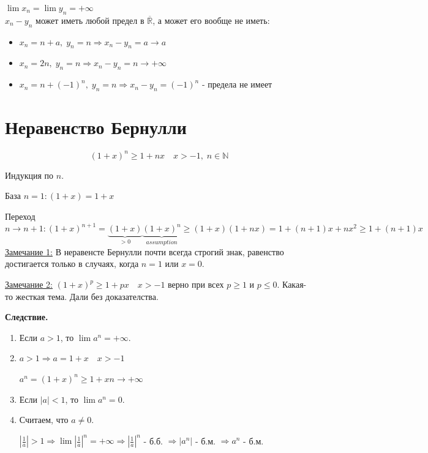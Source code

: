 \documentclass[12pt,letterpaper]{report}
\makeatletter
\theoremstyle{definition}
\renewenvironment{proof}[1][\proofname]{%
   \par\pushQED{\qed}\normalfont%
   \topsep6\p@\@plus6\p@\relax
   \trivlist\item[\hskip\labelsep\bfseries#1\@addpunct{.}]%
   \ignorespaces
}{%
   \popQED\endtrivlist\@endpefalse
}
\makeatother
\begin{document}
    $\lim x_n = \lim y_n = +\infty$ \\
    $x_n - y_n$  может иметь любой предел в $\overline{\mathbb{R}}$, а может его вообще не иметь:
    \begin{itemize}
        \item $x_n = n + a,\; y_n = n \Rightarrow x_n - y_n = a \to a$
        \item $x_n = 2n,\; y_n = n \Rightarrow x_n - y_n = n \to +\infty$
        \item $x_n = n + (-1)^n,\; y_n = n \Rightarrow x_n - y_n = (-1)^n$ - предела не имеет
    \end{itemize}
    
    \section{Неравенство Бернулли}
    \[ (1 + x)^n \geqslant 1 + nx \quad x > -1,\; n \in \mathbb{N} \]
    \begin{proof}
        Индукция по $n$.
        
        База $n = 1: (1 + x) = 1 + x$
        
        Переход $n \to n + 1: (1 + x)^{n + 1} = \underbrace{(1 + x)}_{> 0}\underbrace{(1 + x)^n}_{assumption} \geqslant (1 + x)(1 + nx) = 1 + (n + 1)x + nx^2 \geqslant 1 + (n + 1)x$
    \end{proof}
    \underline{Замечание 1:} В неравенсте Бернулли почти всегда строгий знак, равенство достигается только в случаях, когда $n = 1$ или $x = 0$.
    
    \underline{Замечание 2:} $(1 + x)^p \geqslant 1 + px \quad x > -1$ верно при всех $p \geqslant 1$ и $p \leqslant 0$. Какая-то жесткая тема. Дали без доказателства.
    \vspace{0.5cm}
    
    \textbf{Следствие.} 
    \begin{enumerate}
        \item Если $a > 1$, то $\lim a^n = +\infty$.
        \begin{proof}
            $a > 1 \Rightarrow a = 1 + x \quad x > -1$
            
            $a^n = (1 + x)^n \geqslant 1 + xn \to +\infty$
        \end{proof}
        \item Если $|a| < 1$, то $\lim a^n = 0$.
        \begin{proof}
            Считаем, что $a \neq 0$.
            
            $|\frac{1}{a}| > 1 \Rightarrow \lim |\frac{1}{a}|^n = +\infty \Rightarrow |\frac{1}{a}|^n$ - б.б. $\Rightarrow |a^n|$ - б.м. $\Rightarrow a^n$ - б.м.
        \end{proof}
    \end{enumerate}
    
\end{document}

